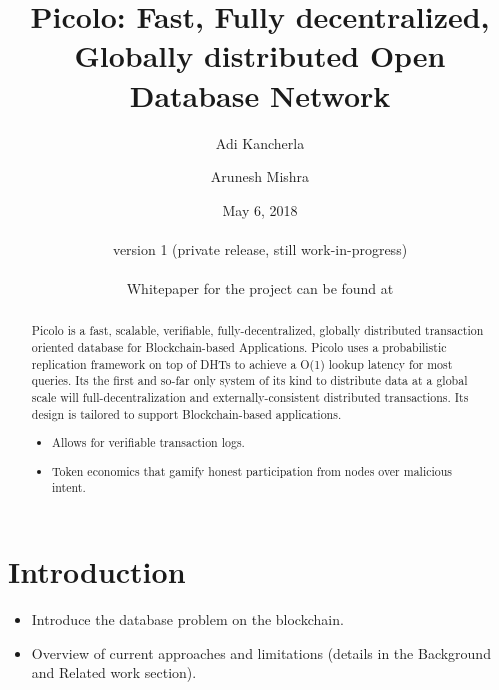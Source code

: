 \documentclass[a4paper]{article}
\begin{document}
\pagecolor{oldlace}

\title{Picolo: Fast, Fully decentralized, Globally distributed Open Database Network}
\author{Adi Kancherla \and Arunesh Mishra}
\date{May 6, 2018 \\\hfill \\version 1 (private release, still work-in-progress) \\\hfill \\Whitepaper for the project can be found at \cite{Picolo_Whitepaper}}
\maketitle
\begin{abstract}

    Picolo is a fast, scalable, verifiable, fully-decentralized, globally distributed transaction oriented database for Blockchain-based Applications. Picolo uses a probabilistic replication framework on top of DHTs to achieve a O(1) lookup latency for most queries. Its the first and so-far only system of its kind to distribute data at a global scale will full-decentralization and externally-consistent distributed transactions. Its design is tailored to support Blockchain-based applications.

    \begin{itemize}
        \item Allows for verifiable transaction logs.
        \item Token economics that gamify honest participation from nodes over malicious intent.
    \end{itemize}

\end{abstract}


\section{Introduction}\label{Sect:Introduction}


    \begin{itemize}
        \item Introduce the database problem on the blockchain.
        \item Overview of current approaches and limitations (details in the Background and Related work section).
    \end{itemize}
\end{document}
